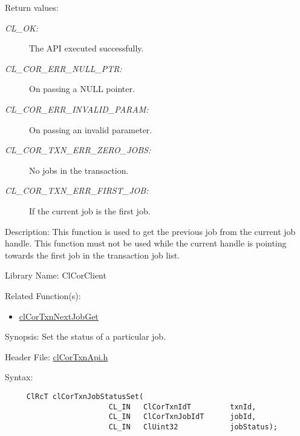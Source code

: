 \begin{Desc}
\item[Return values:]
\begin{description}
\item[{\em CL\_\-OK:}]The API executed successfully. \item[{\em CL\_\-COR\_\-ERR\_\-NULL\_\-PTR:}]On passing a NULL pointer. \item[{\em CL\_\-COR\_\-ERR\_\-INVALID\_\-PARAM:}]On passing an invalid parameter. \item[{\em CL\_\-COR\_\-TXN\_\-ERR\_\-ZERO\_\-JOBS:}]No jobs in the transaction. \item[{\em CL\_\-COR\_\-TXN\_\-ERR\_\-FIRST\_\-JOB:}]If the current job is the first job.\end{description}
\end{Desc}
\begin{Desc}
\item[Description:]This function is used to get the previous job from the current job handle. This function must not be used while the current handle is pointing towards the first job in the transaction job list.\end{Desc}
\begin{Desc}
\item[Library Name:]Cl\-Cor\-Client\end{Desc}
\begin{Desc}
\item[Related Function(s):]\begin{itemize}
\item \hyperlink{group__group13}{cl\-Cor\-Txn\-Next\-Job\-Get}\end{itemize}
\end{Desc}
\begin{Desc}
\item[Synopsis:]Set the status of a particular job.\end{Desc}
\begin{Desc}
\item[Header File:]\hyperlink{cl_cor_txn_api_8h}{cl\-Cor\-Txn\-Api.h}\end{Desc}
\begin{Desc}
\item[Syntax:]

\footnotesize\begin{verbatim}     ClRcT clCorTxnJobStatusSet(
                        CL_IN   ClCorTxnIdT         txnId,
                        CL_IN   ClCorTxnJobIdT      jobId,
                        CL_IN   ClUint32            jobStatus);
\end{verbatim}
\normalsize
\end{Desc}
